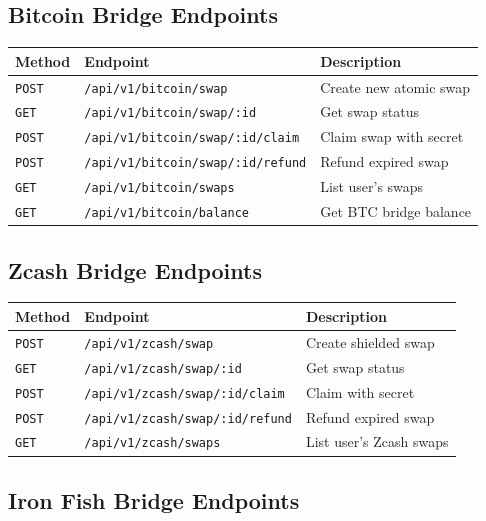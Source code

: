 \documentclass[11pt,a4paper]{article}
\begin{document}
\subsection{Bitcoin Bridge Endpoints}

\begin{table}[H]
\centering
\begin{tabularx}{\textwidth}{l l X}
\toprule
\textbf{Method} & \textbf{Endpoint} & \textbf{Description} \\
\midrule
\texttt{POST} & \texttt{/api/v1/bitcoin/swap} & Create new atomic swap \\
\texttt{GET} & \texttt{/api/v1/bitcoin/swap/:id} & Get swap status \\
\texttt{POST} & \texttt{/api/v1/bitcoin/swap/:id/claim} & Claim swap with secret \\
\texttt{POST} & \texttt{/api/v1/bitcoin/swap/:id/refund} & Refund expired swap \\
\texttt{GET} & \texttt{/api/v1/bitcoin/swaps} & List user's swaps \\
\texttt{GET} & \texttt{/api/v1/bitcoin/balance} & Get BTC bridge balance \\
\bottomrule
\end{tabularx}
\end{table}

\subsection{Zcash Bridge Endpoints}

\begin{table}[H]
\centering
\begin{tabularx}{\textwidth}{l l X}
\toprule
\textbf{Method} & \textbf{Endpoint} & \textbf{Description} \\
\midrule
\texttt{POST} & \texttt{/api/v1/zcash/swap} & Create shielded swap \\
\texttt{GET} & \texttt{/api/v1/zcash/swap/:id} & Get swap status \\
\texttt{POST} & \texttt{/api/v1/zcash/swap/:id/claim} & Claim with secret \\
\texttt{POST} & \texttt{/api/v1/zcash/swap/:id/refund} & Refund expired swap \\
\texttt{GET} & \texttt{/api/v1/zcash/swaps} & List user's Zcash swaps \\
\bottomrule
\end{tabularx}
\end{table}

\subsection{Iron Fish Bridge Endpoints}
\end{document}
